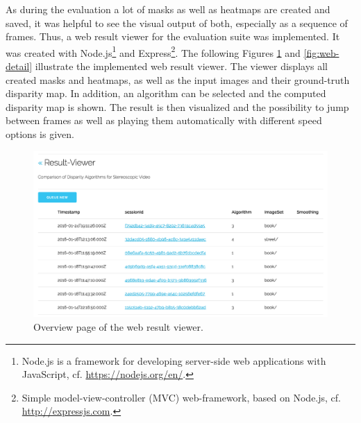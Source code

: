 As during the evaluation a lot of masks as well as heatmaps are created and saved, it was helpful to see the visual output of both, especially as a sequence of frames.
Thus, a web result viewer for the evaluation suite was implemented.
It was created with Node.js\footnote{Node.js is a framework for developing server-side web applications with JavaScript, cf. \url{https://nodejs.org/en/}.} and Express\footnote{Simple model-view-controller (MVC) web-framework, based on Node.js, cf. \url{http://expressjs.com}.}.
\newline\newline\noindent The following Figures \ref{fig:web-overview} and \ref{fig:web-detail} illustrate the implemented web result viewer.
The viewer displays all created masks and heatmaps, as well as the input images and their ground-truth disparity map.
In addition, an algorithm can be selected and the computed disparity map is shown.
The result is then visualized and the possibility to jump between frames as well as playing them automatically with different speed options is given.

\begin{figure}[h!]
  \centering
  \includegraphics[width=1.0\textwidth]{src/images/result-viewer-overview.png}
  \caption[Overview page of the web result viewer]{Overview page of the web result viewer.}
  \label{fig:web-overview}
\end{figure}

